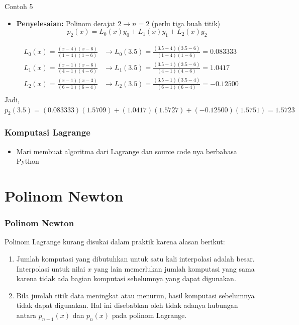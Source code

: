 \documentclass[pdflatex,compress,mathserif]{beamer}
\begin{document}
\begin{frame}{Contoh 5}
	\begin{itemize}
		\item \textbf{Penyelesaian:} Polinom derajat $ 2 \rightarrow n = 2 $ (perlu tiga buah titik)
		\[ p_2 (x) = L_0 (x) y_0 + L_1 (x) y_1 + L_2 (x) y_2 \]
	\end{itemize}
	\begin{align*}
		L_0(x) = \frac{( x - 4 )( x - 6 )}{( 1 - 4 )( 1 - 6 )} &\rightarrow L_0(3.5) = \frac{( 3 . 5 - 4 )( 3 . 5 - 6 )}{( 1 - 4 )( 1 - 6 )} = 0.083333 \\
		L_1(x) = \frac{( x - 1 )( x - 6 )}{( 4 - 1 )( 4 - 6 )} &\rightarrow L_1(3.5) = \frac{( 3 . 5 - 1 )( 3 . 5 - 6 )}{( 4 - 1 )( 4 - 6 )} = 1.0417 \\
		L_2(x) = \frac{( x - 1 )( x - 3 )}{( 6 - 1 )( 6 - 4 )} &\rightarrow L_2(3.5) = \frac{( 3 . 5 - 1 )( 3 . 5 - 4 )}{( 6 - 1 )( 6 - 4 )} = -0.12500 \\
	\end{align*}
		Jadi, $ p_2(3.5) = (0.083333)(1.5709) + (1.0417)(1.5727) + (-0.12500)(1.5751) = 1.5723 $
\end{frame}

\begin{frame}
	\frametitle{Komputasi Lagrange}
	\begin{itemize}
		\item Mari membuat algoritma dari Lagrange dan source code nya berbahasa Python
	\end{itemize}
\end{frame}

\section{Polinom Newton}

\begin{frame}
	\frametitle{Polinom Newton}
	Polinom Lagrange kurang disukai dalam praktik karena alasan berikut:
	\begin{enumerate}
		\item Jumlah komputasi yang dibutuhkan untuk satu kali interpolasi adalah besar. Interpolasi untuk nilai $ x $ yang lain memerlukan jumlah komputasi yang sama karena tidak ada bagian komputasi sebelumnya yang dapat digunakan.
		\item Bila jumlah titik data meningkat atau menurun, hasil komputasi sebelumnya tidak dapat digunakan. Hal ini disebabkan oleh tidak adanya hubungan antara $ p_{n-1}(x) $ dan $ p_n(x) $ pada polinom Lagrange.
	\end{enumerate}
\end{frame}
\end{document}
